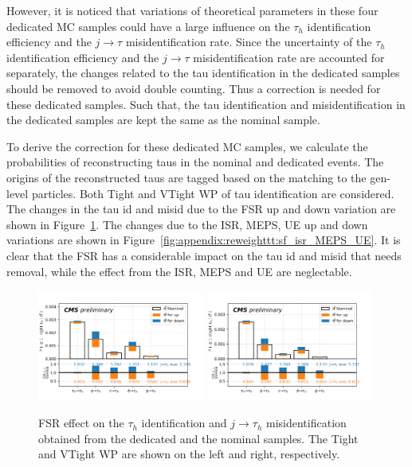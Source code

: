 However, it is noticed that variations of theoretical parameters in these
four dedicated MC samples could have a large influence on the $\tau_h$ identification efficiency
and the $j\to \tau$ misidentification rate. 
Since the uncertainty of the $\tau_h$ identification efficiency and the $j\to \tau$ misidentification rate
are accounted for separately, the changes related to the tau identification 
in the dedicated \ttbar samples should be removed to avoid double counting.
Thus a correction is needed for these dedicated samples.
Such that, the tau identification and misidentification in the dedicated samples 
are kept the same as the nominal \ttbar sample.

To derive the correction for these dedicated MC samples, we calculate the
probabilities of reconstructing taus in the nominal and dedicated \ttbar events.
The origins of the reconstructed taus are tagged based on the matching to the
gen-level particles. Both Tight and VTight WP of tau identification are
considered. The changes in the tau id and misid due to the FSR up and down 
variation are shown in Figure~\ref{fig:appendix:reweighttt:sf_fsr}. The changes
due to the ISR, MEPS, UE up and down variations are shown in Figure~\ref{fig:appendix:reweighttt:sf_isr_MEPS_UE}.
It is clear that the FSR has a considerable impact on the tau id and misid that 
needs removal, while the effect from the ISR, MEPS and UE are neglectable.


\begin{figure}
    \centering
    \includegraphics[width=0.49\textwidth]{chapters/Analysis/sectionSystematics/figures/ttTheoretical/2020_MCRatio_fsr_tauGenFlavor_tauTight.png}
    \includegraphics[width=0.49\textwidth]{chapters/Analysis/sectionSystematics/figures/ttTheoretical/2020_MCRatio_fsr_tauGenFlavor_tauVTight.png}
    \caption{FSR effect on the $\tau_h$ identification and $j \to \tau_h$ misidentification obtained from the dedicated and the nominal \ttbar samples. 
    The Tight and VTight WP are shown on the left and right, respectively.
    }
    \label{fig:appendix:reweighttt:sf_fsr}
\end{figure}


